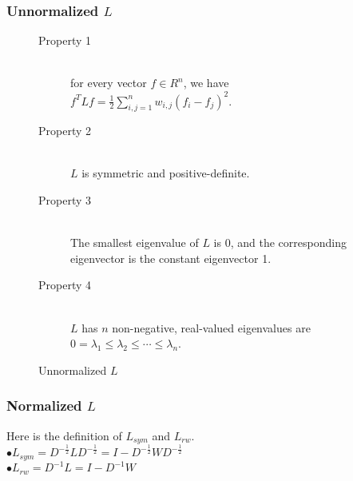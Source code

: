 \subsubsection{Unnormalized $L$}
\begin{figure}[ht]
\begin{mdframed}
\begin{description}
\item[Property 1] \hfill \\
for every vector $f \in R^n$, we have $f^T L f = \frac{1}{2} \sum_{i,j=1}^{n} w_{i,j}(f_i - f_j)^2$.
\item[Property 2] \hfill \\
$L$ is symmetric and positive-definite.
\item[Property 3] \hfill \\
The smallest eigenvalue of $L$ is 0, and the corresponding eigenvector is the constant eigenvector 1.
\item[Property 4] \hfill \\
$L$ has $n$ non-negative, real-valued eigenvalues are $0 = \lambda_1 \leq \lambda_2 \leq \cdots \leq  \lambda_n$.
\end{description}
\end{mdframed}
\caption{Unnormalized $L$}
\end{figure}

\subsubsection{Normalized $L$}
Here is the definition of $L_{sym}$ and $L_{rw}$. \\
$\bullet$$L_{sym} = D^{-\frac{1}{2}} L D^{-\frac{1}{2}} = I - D^{-\frac{1}{2}} W D^{-\frac{1}{2}}$ \\
$\bullet$$L_{rw} = D^{-1} L = I - D^{-1} W$

